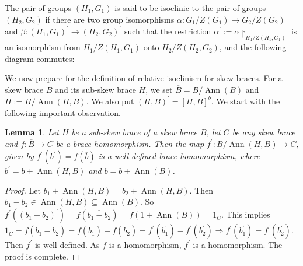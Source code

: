\documentclass[10pt,a4paper]{amsart}
\numberwithin{equation}{section}
\newtheorem{lem}[equation]{Lemma}
\newcommand{\Ann}{\operatorname{Ann} }
\begin{document}
The pair of groups $(H_1,G_1)$ is said to be isoclinic to the pair of groups $(H_2,G_2)$ if there are two group isomorphisms $\alpha:G_1/Z{(G_1)}\rightarrow G_2/Z{(G_2)}$ and $\beta:(H_1,G_1)^\prime\rightarrow(H_2,G_2)^\prime$ such that the restriction $\alpha^\prime:=\alpha{\restriction}_{H_1/Z{(H_1,G_1)}}$ is an isomorphism from $H_1/Z{(H_1,G_1)}$ onto $H_2/Z{(H_2,G_2)}$, and the following diagram commutes:
\begin{center}
\end{center}


We now prepare for the definition of relative isoclinism for skew braces. For a skew brace $B$ and its sub-skew brace $H$, we set $\overline{B}= B/\Ann(B)$ and $\overline{H}:= H/\Ann(H,B)$. We also put $(H,B)^\prime=[H,B]^b$. We start with the following important observation.
\begin{lem} %
    Let $H$ be a sub-skew brace of a skew brace $B$, let $C$ be any skew brace and $f: \overline{B} \rightarrow C$ be a brace homomorphism. Then the map $f^\prime :B/\Ann(H,B) \to C$, given by $f^\prime({b}^\prime)=f(\overline{b})$
    is a well-defined brace homomorphism, 
    where ${b}^\prime=b+\Ann(H,B)$ and $\overline{b}=b+ \Ann(B)$. 
\end{lem}
\begin{proof}
    Let $b_1+\Ann(H, B)=b_2+\Ann(H, B)$. Then $b_1-b_2\in \Ann(H, B)\subseteq \Ann(B)$. So $f^\prime({(b_1-b_2)}^\prime)=f(\overline{b_1-b_2})=f(1+\Ann(B))=1_C$. This implies $1_C=f(\overline{b_1-b_2})=f(\overline{b_1})-f(\overline{b_2})=f^\prime(b_1^\prime)-f^\prime (b_2^\prime)\Rightarrow f^\prime(b_1^\prime)=f^\prime (b_2^\prime)$. Then $f^\prime$ is well-defined. As $f$ is a homomorphism, $f^\prime$ is a homomorphism. The proof is complete.
\end{proof}

     
      
\end{document}
